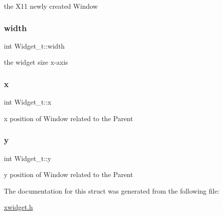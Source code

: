 the X11 newly created Window \mbox{\label{structWidget__t_a3204c88196ed5793250b3530dd719037}} 
\subsubsection{\texorpdfstring{width}{width}}
{\footnotesize\ttfamily int Widget\+\_\+t\+::width}

the widget size x-\/axis \mbox{\label{structWidget__t_aac6ce7621b682bb4ce88bac9181c34a7}} 
\subsubsection{\texorpdfstring{x}{x}}
{\footnotesize\ttfamily int Widget\+\_\+t\+::x}

x position of Window related to the Parent \mbox{\label{structWidget__t_acb9402de44e47837e1821b93fc052b38}} 
\subsubsection{\texorpdfstring{y}{y}}
{\footnotesize\ttfamily int Widget\+\_\+t\+::y}

y position of Window related to the Parent 

The documentation for this struct was generated from the following file\+:\begin{DoxyCompactItemize}
\item 
\hyperlink{xwidget_8h}{xwidget.\+h}\end{DoxyCompactItemize}
